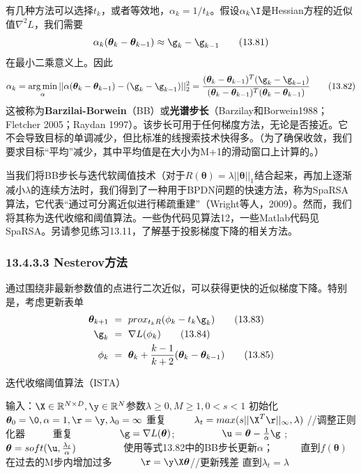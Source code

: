 \documentclass[a4paper]{article}
\DeclareMathOperator*{\argmin}{arg\,min}
\begin{document}
有几种方法可以选择$t_k$，或者等效地，$\alpha_k=1/t_k$。假设$\alpha_k \I$是Hessian方程的近似值$\nabla^2L$，我们需要
\begin{equation}
	\alpha_k(\boldsymbol{\theta}_k-\boldsymbol{\theta}_{k-1})\approx \g_k-\g_{k-1}\tag{13.81}
\end{equation}
在最小二乘意义上。因此
\begin{equation}
	\alpha_k=\argmin_\alpha||\alpha(\boldsymbol{\theta}_k-\boldsymbol{\theta}_{k-1})-(\g_k-\g_{k-1})||_2^2=\dfrac{(\boldsymbol{\theta}_k-\boldsymbol{\theta}_{k-1})^T(\g_k-\g_{k-1})}{(\boldsymbol{\theta}_k-\boldsymbol{\theta}_{k-1})^T(\boldsymbol{\theta}_k-\boldsymbol{\theta}_{k-1})}\tag{13.82}
\end{equation}
这被称为\textbf{Barzilai-Borwein}（BB）或\textbf{光谱步长}（Barzilay和Borwein1988；Fletcher 2005；Raydan 1997）。该步长可用于任何梯度方法，无论是否接近。它不会导致目标的单调减少，但比标准的线搜索技术快得多。（为了确保收敛，我们要求目标“平均”减少，其中平均值是在大小为M+1的滑动窗口上计算的。）

当我们将BB步长与迭代软阈值技术（对于$R(\boldsymbol{\theta})=\lambda||\boldsymbol{\theta}||_1$结合起来，再加上逐渐减小$\lambda$的连续方法时，我们得到了一种用于BPDN问题的快速方法，称为SpaRSA算法，它代表“通过可分离近似进行稀疏重建”（Wright等人，2009）。然而，我们将其称为迭代收缩和阈值算法。一些伪代码见算法12，一些Matlab代码见SpaRSA。另请参见练习13.11，了解基于投影梯度下降的相关方法。

\subsubsection*{13.4.3.3 Nesterov方法}
通过围绕非最新参数值的点进行二次近似，可以获得更快的近似梯度下降。特别是，考虑更新表单
\begin{align}
	\boldsymbol{\theta}_{k+1}\ &=\ prox_{t_kR}(\phi
_k-t_k\g_k)\tag{13.83}\\
\g_k\ &=\ \nabla L(\phi_k)\tag{13.84}\\
\phi_k\ &=\ \boldsymbol{\theta}_k+\dfrac{k-1}{k+2}(\boldsymbol{\theta}_k-\boldsymbol{\theta}_{k-1})\tag{13.85}
\end{align}


\renewcommand{\thealgorithm}{13.2}
\begin{algorithm}
	\caption{迭代收缩阈值算法（ISTA）}
	\label{alg:A}
	\begin{algorithmic}[1]
		\STATE 输入：$\X \in \mathbb{R}^{N\times D},\y \in \mathbb{R}^N $参数$\lambda\ge 0,M\ge 1,0<s<1$
		\STATE 初始化 $\boldsymbol{\theta}_0=\0,\alpha=1,\r=\y ,\lambda_0=\infty$
		\STATE 重复
		\STATE \ \ \ \ \ $\lambda_t=max(s||\X^T\r||_\infty,\lambda)$ //调整正则化器
		\STATE \ \ \ \ \ 重复
		\STATE \ \ \ \ \ \ \ \ \  $\g =\nabla L(\boldsymbol{\theta})$;
		\STATE \ \ \ \ \ \ \ \ \  $\u =\boldsymbol{\theta}-\frac{1}{\alpha}\g$ ;
		\STATE \ \ \ \ \ \ \ \ \  $\boldsymbol{\theta}=soft(\u ,\frac{\lambda_t}{\alpha})$
		\STATE \ \ \ \ \ \ \ \ \  使用等式13.82中的BB步长更新$\alpha$；
		\STATE \ \ \ \ \ 直到$f(\boldsymbol{\theta})$在过去的M步内增加过多
		\STATE \ \ \ \ \ $\r=\y \X\boldsymbol{\theta}$//更新残差
		\STATE 直到$\lambda_t=\lambda$
	\end{algorithmic}
\end{algorithm}
\end{document}
